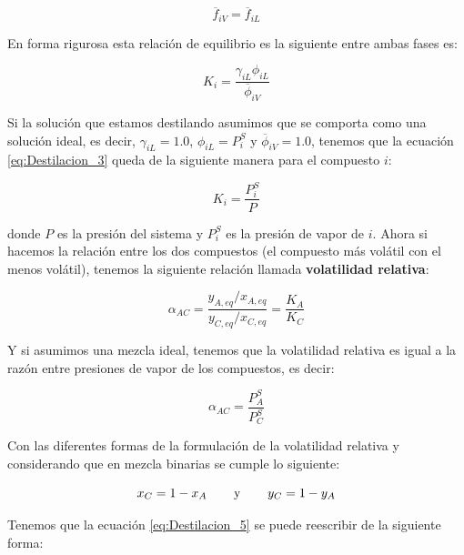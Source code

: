 \documentclass[11pt]{book}
\begin{document}
\begin{equation}
    \label{eq:Destilacion_2}
    \overline{f}_{iV} = \overline{f}_{iL}
\end{equation}

En forma rigurosa esta relación de equilibrio es la siguiente entre ambas fases es:

\begin{equation}
    \label{eq:Destilacion_3}
    K_i = \frac{\gamma_{iL} \phi_{iL}}{\overline{\phi}_{iV}}
\end{equation}

Si la solución que estamos destilando asumimos que se comporta como una solución ideal, es decir, $\gamma_{iL} = 1.0$, $\phi_{iL} = P_i^S$ y $\overline{\phi}_{iV} = 1.0$, tenemos que la ecuación \ref{eq:Destilacion_3} queda de la siguiente manera para el compuesto $i$:

\begin{equation}
    \label{eq:Destilacion_4}
    K_i = \frac{P_i^S}{P}
\end{equation}

donde $P$ es la presión del sistema y $P_i^S$ es la presión de vapor de $i$. Ahora si hacemos la relación entre los dos compuestos (el compuesto más volátil con el menos volátil), tenemos la siguiente relación llamada \textbf{volatilidad relativa}:

\begin{equation}
    \label{eq:Destilacion_5}
    \alpha_{AC} = \frac{y_{A,eq}/x_{A,eq}}{y_{C,eq}/x_{C,eq}} = \frac{K_A}{K_C}
\end{equation}

Y si asumimos una mezcla ideal, tenemos que la volatilidad relativa es igual a la razón entre presiones de vapor de los compuestos, es decir:

\begin{equation*}
    \alpha_{AC} = \frac{P_A^S}{P_C^S}
\end{equation*}

Con las diferentes formas de la formulación de la volatilidad relativa y considerando que en mezcla binarias se cumple lo siguiente:

\begin{equation*}
    x_C = 1 - x_A \hspace{0.75cm} \textrm{y} \hspace{0.75cm} y_C = 1-y_A
\end{equation*}

Tenemos que la ecuación \ref{eq:Destilacion_5} se puede reescribir de la siguiente forma:
\end{document}
